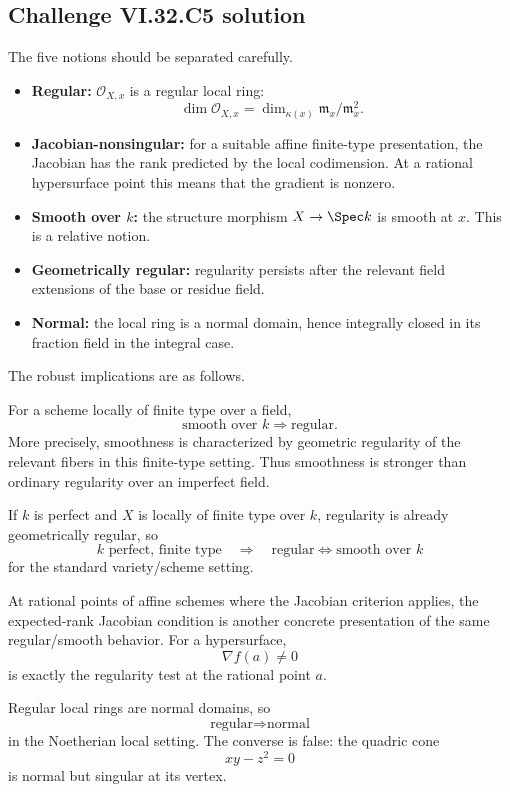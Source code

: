 \subsection*{Challenge VI.32.C5 solution}
\begin{solution}
The five notions should be separated carefully.

\begin{itemize}
\item \textbf{Regular:}
\(\mathcal O_{X,x}\) is a regular local ring:
\[
\dim\mathcal O_{X,x}
=
\dim_{\kappa(x)}\mathfrak m_x/\mathfrak m_x^2.
\]
\item \textbf{Jacobian-nonsingular:}
for a suitable affine finite-type presentation, the Jacobian has the rank predicted by the local codimension.
At a rational hypersurface point this means that the gradient is nonzero.
\item \textbf{Smooth over \(k\):}
the structure morphism \(X\to\Spec k\) is smooth at \(x\).  This is a relative notion.
\item \textbf{Geometrically regular:}
regularity persists after the relevant field extensions of the base or residue field.
\item \textbf{Normal:}
the local ring is a normal domain, hence integrally closed in its fraction field in the integral case.
\end{itemize}

The robust implications are as follows.

For a scheme locally of finite type over a field,
\[
\boxed{\text{smooth over }k\Longrightarrow\text{regular}.}
\]
More precisely, smoothness is characterized by geometric regularity of the relevant fibers in this finite-type
setting.  Thus smoothness is stronger than ordinary regularity over an imperfect field.

If \(k\) is perfect and \(X\) is locally of finite type over \(k\), regularity is already geometrically regular,
so
\[
\boxed{
k\text{ perfect, finite type}
\quad\Longrightarrow\quad
\text{regular}\iff\text{smooth over }k
}
\]
for the standard variety/scheme setting.

At rational points of affine schemes where the Jacobian criterion applies, the expected-rank Jacobian condition
is another concrete presentation of the same regular/smooth behavior.  For a hypersurface,
\[
\nabla f(a)\ne0
\]
is exactly the regularity test at the rational point \(a\).

Regular local rings are normal domains, so
\[
\boxed{\text{regular}\Longrightarrow\text{normal}}
\]
in the Noetherian local setting.  The converse is false: the quadric cone
\[
xy-z^2=0
\]
is normal but singular at its vertex.


\end{solution}
